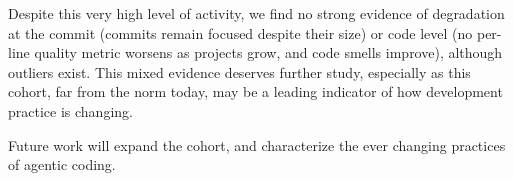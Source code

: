 \documentclass[smallextended]{svjour3}
\begin{document}
Despite this very high level of activity, we find no strong evidence of degradation at the commit (commits remain focused despite their size) or code level (no per-line quality metric worsens as projects grow, and code smells improve), although outliers exist. This mixed evidence deserves further study, especially as this cohort, far from the norm today, may be a leading indicator of how development practice is changing.


Future work will expand the cohort, and characterize the ever changing practices of agentic coding.








\end{document}
